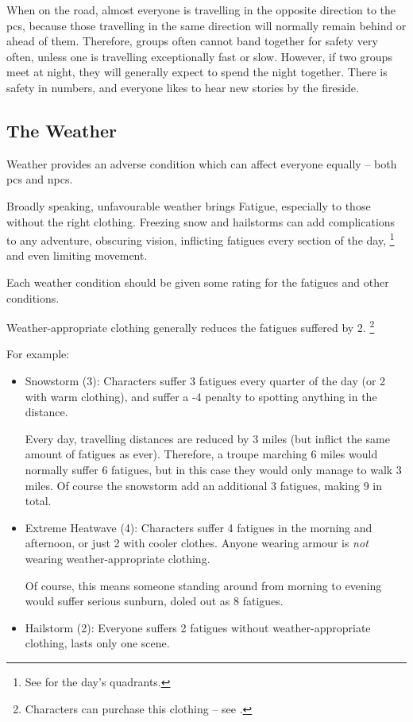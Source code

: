 \begin{multicols}{2}
When on the road, almost everyone is travelling in the opposite direction to the \glspl{pc}, because those travelling in the same direction will normally remain behind or ahead of them.
Therefore, groups often cannot band together for safety very often, unless one is travelling exceptionally fast or slow.
However, if two groups meet at night, they will generally expect to spend the night together.
There is safety in numbers, and everyone likes to hear new stories by the fireside.

\subsection{The Weather}

Weather provides an adverse condition which can affect everyone equally -- both \glspl{pc} and \glspl{npc}.

Broadly speaking, unfavourable weather brings Fatigue, especially to those without the right clothing.
Freezing snow and hailstorms can add complications to any \gls{adventure}, obscuring vision, inflicting \glspl{fatigue} every section of the day,
\footnote{See  for the day's quadrants.}
and even limiting movement.

Each weather condition should be given some rating for the \glspl{fatigue} and other conditions.

Weather-appropriate clothing generally reduces the \glspl{fatigue} suffered by 2.%
\footnote{Characters can purchase this clothing -- see .}

For example:

\begin{itemize}

  \item
  Snowstorm (3):
  Characters suffer 3 \glspl{fatigue} every quarter of the day (or 2 with warm clothing), and suffer a -4 penalty to spotting anything in the distance.

  Every day, travelling distances are reduced by 3 miles (but inflict the same amount of \glspl{fatigue} as ever).
  Therefore, a troupe marching 6 miles would normally suffer 6 \glspl{fatigue}, but in this case they would only manage to walk 3 miles.
  Of course the snowstorm add an additional 3 \glspl{fatigue}, making 9 in total.
  \item
  Extreme Heatwave (4):
  Characters suffer 4 \glspl{fatigue} in the morning and afternoon, or just 2 with cooler clothes.
  Anyone wearing armour is \emph{not} wearing weather-appropriate clothing.

  Of course, this means someone standing around from morning to evening would suffer serious sunburn, doled out as 8 \glspl{fatigue}.
  \item
  Hailstorm (2):
  Everyone suffers 2 \glspl{fatigue} without weather-appropriate clothing, lasts only one scene.

\end{itemize}

\end{multicols}

